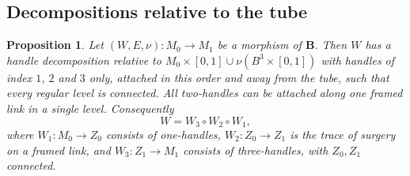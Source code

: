 \documentclass[11pt]{amsart}
\newtheorem{proposition}[theorem]{Proposition}
\theoremstyle{definition}
\theoremstyle{remark}
\theoremstyle{plain}
\numberwithin{equation}{section}
\newcommand{\bB}{\mathbf{B}}
\begin{document}
\subsection{Decompositions relative to the tube}

\begin{proposition}\label{prop:handles}
Let $(W,E,\nu)\colon M_0\to M_1$ be a morphism of $\bB$. Then $W$ has a
handle decomposition relative to $M_0\times[0,1]\cup\nu(B^3\times[0,1])$
with handles of index $1$, $2$ and $3$ only, attached in this order and
away from the tube, such that every regular level is connected. All
two-handles can be attached along one framed link in a single level.
Consequently
\[
W=W_3\circ W_2\circ W_1,
\]
where $W_1\colon M_0\to Z_0$ consists of one-handles, $W_2\colon Z_0\to
Z_1$ is the trace of surgery on a framed link, and $W_3\colon Z_1\to M_1$
consists of three-handles, with $Z_0,Z_1$ connected.
\end{proposition}
\end{document}
